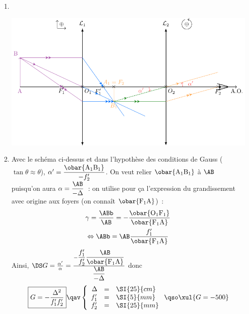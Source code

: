 \documentclass[../../main/main.tex]{subfiles}
\begin{document}
{\begin{enumerate}
\[			      \left\{
			      \begin{array}{rcl}
				      f'_1   & = & \SI{5}{mm}   \\
				      \Delta & = & \SI{250}{mm}
			      \end{array}
			      \right.
			      \qso
			      \xul{\obar{\rm F_1A} = \SI{-0.1}{mm}}\]
		\item ~
		      \begin{center}
			      \includegraphics[width=\linewidth]{microscope.pdf}
			      \label{fig:microscope}
		      \end{center}

		\item Avec le schéma ci-dessus et dans l'hypothèse des conditions de Gauss
		      ($\tan\theta \approx \theta$), $\alpha' = \dfrac{\obar{\rm
					      A_1B_1}}{-f'_2}$. On veut relier $\obar{\rm A_1B_1}$ à $\AB$ puisqu'on
		      aura $\alpha = \dfrac{\AB}{-\Delta}$~: on utilise pour ça l'expression
		      du grandissement avec origine aux foyers (on connaît $\obar{\rm
				      F_1A}$)~:
		      \begin{gather*}
			      \gamma = \frac{\ABb}{\AB} = - \frac{\obar{\rm O_1F_1}}{\obar{\rm
					      F_1A}}
			      \\\Leftrightarrow
			      \ABb = \AB \frac{f'_1}{\obar{\rm F_1A}}
		      \end{gather*}
		      Ainsi,
		      $\DS G = \frac{\alpha'}{\alpha} =
			      \frac{
				      -\dfrac{f'_1}{f'_2} \dfrac{\AB}{\obar{\rm F_1A}}
			      }{
				      \dfrac{\AB}{-\Delta}
			      }$ donc
		      \[
			      \boxed{G = -\frac{\Delta^2}{f'_1f'_2}}
			      \qav
			      \left\{
			      \begin{array}{rcl}
				      \Delta & = & \SI{25}{cm} \\
				      f'_1   & = & \SI{5}{mm}  \\
				      f'_2   & = & \SI{25}{mm}
			      \end{array}
			      \right.
			      \qso
			      \xul{G=-500}
		      \]
	\end{enumerate}
}
\end{document}
